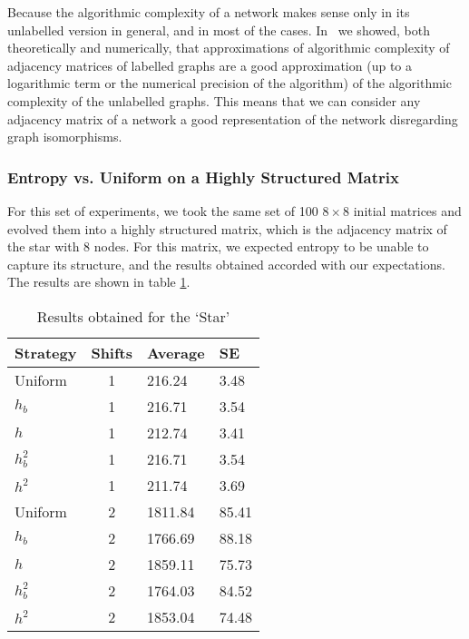 \documentclass[10pt]{article}
\begin{document}
Because the algorithmic complexity of a network makes sense only in its unlabelled version in general, and in most of the cases. In~\cite{Zenil14,zenilmethods,zenil2016decomposition} we showed, both theoretically and numerically, that approximations of algorithmic complexity of adjacency matrices of labelled graphs are a good approximation (up to a logarithmic term or the numerical precision of the algorithm) of the algorithmic complexity of the unlabelled graphs. This means that we can consider any adjacency matrix of a network a good representation of the network disregarding graph isomorphisms.


\subsubsection{Entropy vs. Uniform on a Highly Structured     Matrix}\label{entropy-vs-uniform-on-a-highly-structured-matrix.}

For this set of experiments, we took the same set of 100 \(8 \times 8\)
initial matrices and evolved them into a highly structured matrix, which is the adjacency matrix of the star with 8 nodes. For this matrix, we expected entropy to be unable to capture its structure, and the results obtained accorded with our expectations. The results are shown in table \ref{hC}.

\begin{table}[!t]
    \centering
    \caption{Results obtained for the `Star'}
    \label{hC}
\begin{tabular}[]{@{}l|c|l|l@{}}
    \hline
    Strategy & Shifts & Average & SE\\
    \hline
    Uniform & 1 & 216.24 & 3.48 \\
    \(h_b\) & 1 & 216.71 & 3.54 \\
    \(h\) & 1 & 212.74 & 3.41 \\
    \(h^2_b\) & 1 & 216.71 & 3.54 \\
    \(h^2\) & 1 & 211.74 & 3.69 \\
    Uniform & 2 & 1811.84 & 85.41 \\
    \(h_b\) & 2 & 1766.69 & 88.18 \\
    \(h\) & 2 & 1859.11 & 75.73 \\
    \(h^2_b\) & 2 & 1764.03 & 84.52 \\
    \(h^2\) & 2 & 1853.04 & 74.48 \\
    \hline
\end{tabular}
\end{table}
\end{document}
